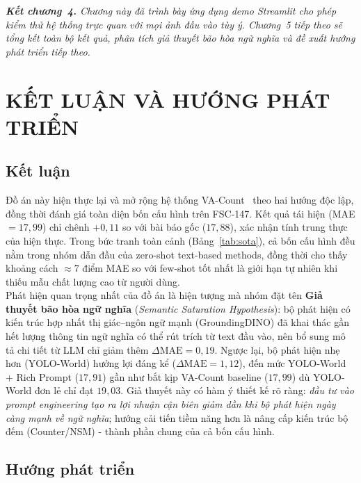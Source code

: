 \documentclass[a4paper,12pt]{report}
\numberwithin{figure}{chapter}
\numberwithin{table}{chapter}
\begin{document}
\bigskip
\noindent\textit{\textbf{Kết chương~4.} Chương này đã trình bày ứng dụng demo Streamlit cho phép kiểm thử hệ thống trực quan với mọi ảnh đầu vào tùy ý. Chương~5 tiếp theo sẽ tổng kết toàn bộ kết quả, phân tích giả thuyết bão hòa ngữ nghĩa và đề xuất hướng phát triển tiếp theo.}

\chapter{KẾT LUẬN VÀ HƯỚNG PHÁT TRIỂN}
\label{ch:conclusion}

\section{Kết luận}

Đồ án này hiện thực lại và mở rộng hệ thống VA-Count~\cite{vacount} theo hai hướng độc lập, đồng thời đánh giá toàn diện bốn cấu hình trên FSC-147. Kết quả tái hiện (MAE $= 17{,}99$) chỉ chênh $+0{,}11$ so với bài báo gốc ($17{,}88$), xác nhận tính trung thực của hiện thực. Trong bức tranh toàn cảnh (Bảng~\ref{tab:sota}), cả bốn cấu hình đều nằm trong nhóm dẫn đầu của zero-shot text-based methods, đồng thời cho thấy khoảng cách $\approx 7$ điểm MAE so với few-shot tốt nhất là giới hạn tự nhiên khi thiếu mẫu chất lượng cao từ người dùng.\\[1em]
Phát hiện quan trọng nhất của đồ án là hiện tượng mà nhóm đặt tên \textbf{Giả thuyết bão hòa ngữ nghĩa} (\textit{Semantic Saturation Hypothesis}): bộ phát hiện có kiến trúc hợp nhất thị giác--ngôn ngữ mạnh (GroundingDINO) đã khai thác gần hết lượng thông tin ngữ nghĩa có thể rút trích từ text đầu vào, nên bổ sung mô tả chi tiết từ LLM chỉ giảm thêm $\Delta\mathrm{MAE} = 0{,}19$. Ngược lại, bộ phát hiện nhẹ hơn (YOLO-World) hưởng lợi đáng kể ($\Delta\mathrm{MAE} = 1{,}12$), đến mức YOLO-World + Rich Prompt ($17{,}91$) gần như bắt kịp VA-Count baseline ($17{,}99$) dù YOLO-World đơn lẻ chỉ đạt $19{,}03$. Giả thuyết này có hàm ý thiết kế rõ ràng: \emph{đầu tư vào prompt engineering tạo ra lợi nhuận cận biên giảm dần khi bộ phát hiện ngày càng mạnh về ngữ nghĩa}; hướng cải tiến tiềm năng hơn là nâng cấp kiến trúc bộ đếm (Counter/NSM) - thành phần chung của cả bốn cấu hình.

\section{Hướng phát triển}
\end{document}

